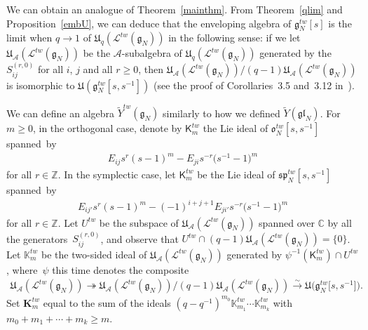 \documentclass[pdftex]{sigma}
\numberwithin{theorem}{section}
\numberwithin{proposition}{section}
\numberwithin{lemma}{section}
\numberwithin{corollary}{section}
\numberwithin{definition}{section}
\numberwithin{example}{section}
\numberwithin{remark}{section}
\numberwithin{note}{section}
\numberwithin{equation}{section}
\begin{document}
We can obtain an analogue of Theorem~\ref{mainthm}.
From Theorem~\ref{qlim} and Proposition~\ref{embU}, we can deduce that the enveloping algebra of
$\mathfrak{g}_N^{tw}[s]$ is the limit when $q\rightarrow 1$ of $\mathfrak{U}_q(\mathcal{L}^{tw}(\mathfrak{g}_N))$ in the
following sense: if we let $\mathfrak{U}_{\mathcal{A}}(\mathcal{L}^{tw}(\mathfrak{g}_N))$ be the
$\mathcal{A}$-subalgebra of $\mathfrak{U}_q(\mathcal{L}^{tw}(\mathfrak{g}_N))$ generated by the $S_{ij}^{(r,0)}$ for all
$i$, $j$ and all $r\ge 0$, then
$\mathfrak{U}_{\mathcal{A}}(\mathcal{L}^{tw}(\mathfrak{g}_N))/(q-1)\mathfrak{U}_{\mathcal{A}}(\mathcal{L}^{tw}(\mathfrak{g}_N))$
is isomorphic to $\mathfrak{U}(\mathfrak{g}_N^{tw}[s,s^{-1}])$ (see the proof of Corollaries~3.5 and~3.12
in~\cite{MRS}).

We can def\/ine an algebra $\widetilde{Y}^{tw}(\mathfrak{g}_N)$ similarly to how we def\/ined
$\widetilde{Y}(\mathfrak{gl}_N)$.
For $m\ge 0$, in the orthogonal case, denote by $\mathsf{K}_m^{tw}$ the Lie ideal of $\mathfrak{o}_N^{tw}[s,s^{-1}]$
spanned~by
\begin{gather*}
E_{ij} s^r(s-1)^m - E_{ji} s^{-r} \big(s^{-1}-1\big)^m
\end{gather*}
for all $r \in \mathbb{Z}$.
In the symplectic case, let $\mathsf{K}_m^{tw}$ be the Lie ideal of $\mathfrak{sp}_N^{tw}[s,s^{-1}]$ spanned~by
\begin{gather*}
E_{ij'}s^r(s-1)^m - (-1)^{i+j+1} E_{ji'} s^{-r}\big(s^{-1}-1\big)^m
\end{gather*}
for all $r \in \mathbb{Z}$.
Let $U^{tw}$ be the subspace of $\mathfrak{U}_{\mathcal{A}}(\mathcal{L}^{tw}(\mathfrak{g}_N))$ spanned over $\mathbb{C}$
by all the genera\-tors~$S_{ij}^{(r,0)}$, and observe that $U^{tw}\cap
(q-1)\mathfrak{U}_{\mathcal{A}}(\mathcal{L}^{tw}(\mathfrak{g}_N)) = \{0 \}$.
Let $\mathbb{K}_m^{tw}$ be the two-sided ideal of $\mathfrak{U}_{\mathcal{A}}(\mathcal{L}^{tw}(\mathfrak{g}_N))$
generated by $\psi^{-1}(\mathsf{K}_m^{tw})\cap U^{tw}$, where~$\psi$ this time denotes the composite
\begin{gather*}
\mathfrak{U}_{\mathcal{A}}(\mathcal{L}^{tw}(\mathfrak{g}_N)) \twoheadrightarrow
\mathfrak{U}_{\mathcal{A}}(\mathcal{L}^{tw}(\mathfrak{g}_N))/(q-1)\mathfrak{U}_{\mathcal{A}}(\mathcal{L}^{tw}(\mathfrak{g}_N))
\stackrel{\sim}{\longrightarrow} \mathfrak{U}\big(\mathfrak{g}_N^{tw}\big[s,s^{-1}\big]\big).
\end{gather*}
Set $\mathbf{K}_m^{tw}$ equal to the sum of the ideals $(q-q^{-1})^{m_0} \mathbb{K}_{m_1}^{tw}\cdots
\mathbb{K}_{m_k}^{tw}$ with $m_0+m_1+\cdots + m_k \geq m$.
\end{document}
